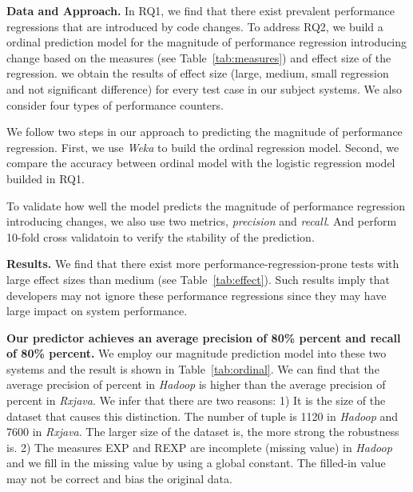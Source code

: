 \textbf{Data and Approach.}
In RQ1, we find that there exist prevalent performance regressions that are introduced by code changes. To address RQ2, we build a ordinal prediction model for the magnitude of performance regression introducing change based on the measures (see Table~\ref{tab:measures}) and effect size of the regression. we obtain the results of effect size (large, medium, small regression and not significant difference) for every test case in our subject systems. We also consider four types of performance counters.

We follow two steps in our approach to predicting the magnitude of performance regression. First, we use \emph{Weka} to build the ordinal regression model. Second, we compare the accuracy between ordinal model with the logistic regression model builded in RQ1. 

To validate how well the model predicts the magnitude of performance regression introducing changes, we also use two metrics, \emph{precision} and \emph{recall}. And perform 10-fold cross validatoin to verify the stability of the prediction.

\textbf{Results.} We find that there exist more performance-regression-prone tests with large effect sizes than medium (see Table~\ref{tab:effect}). Such results imply that developers may not ignore these performance regressions since they may have large impact on system performance.

\textbf{Our predictor achieves an average precision of 80\% percent and recall of 80\% percent.} We employ our magnitude prediction model into these two systems and the result is shown in Table~\ref{tab:ordinal}. We can find that the average precision of  percent in \emph{Hadoop} is higher than the average precision of  percent in \emph{Rxjava}. We infer that there are two reasons: 1) It is the size of the dataset that causes this distinction. The number of tuple is 1120 in \emph{Hadoop} and 7600 in \emph{Rxjava}. The larger size of the dataset is, the more strong the robustness is. 2) The measures EXP and REXP  are incomplete (missing value) in \emph{Hadoop} and we fill in the missing value by using a global constant. The filled-in value may not be correct and bias the original data.

